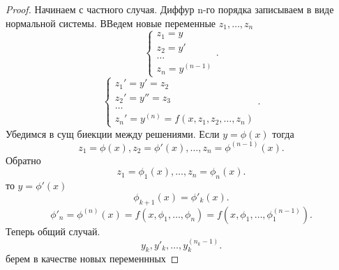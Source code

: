 \documentclass[14pt]{extarticle}
\begin{document}
\begin{proof}
	Начинаем с частного случая. Диффур n-го порядка записываем в виде нормальной системы. ВВедем новые переменные $z_1,\dots,z_{n}$
	\[
		\begin{cases}
			z_1 = y  \\
			z_2 = y' \\
			\dots    \\
			z_{n} = y^{(n - 1)}
		\end{cases}
		.\]
	\[
		\begin{cases}
			z_1' = y' = z_2 \\
			z_2' = y''= z_3 \\
			\dots           \\
			z_{n}' = y^{(n)} = f(x,z_1,z_2,\dots,z_{n})
		\end{cases}
		.\]
	Убедимся в сущ биекции между решениями. Если $y =  \phi(x)$ тогда
	\[
		z_1 = \phi(x), z_2 = \phi'(x) ,\dots,z_{n} = \phi^{(n-1)}(x)
		.\]
	Обратно
	\[
		z_1= \phi_1(x),\dots,z_{n} = \phi_{n}(x)
		.\]
	то  $y =\phi'(x)$
	\[
		\phi_{k+1}(x) = \phi'_{k}(x)
		.\]
	\[
		\phi'_{n} = \phi^{(n)}(x) = f(x,\phi_1,\dots,\phi_{n}) = f(x,\phi_1,\dots,\phi_1^{(n-1)})
		.\]
	Теперь общий случай.
	\[
		y_{k}, y'_{k},\dots,y^{(n_{k} - 1)}_{k}
		.\]
	берем  в качестве новых переменнных
\end{proof}
\end{document}
